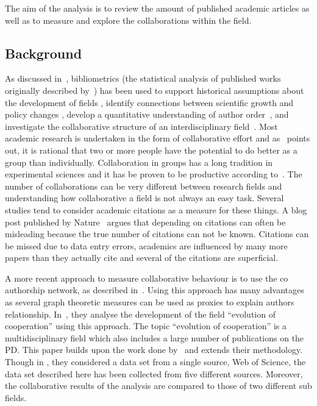 \documentclass{article}
\theoremstyle{definition}
\begin{document}
The aim of the analysis is to review the amount of published academic articles
as well as to measure and explore the collaborations within the field.


\subsection{Background}\label{section:background}

As discussed in~\cite{youngblood2018}, bibliometrics (the statistical analysis
of published works originally described by~\cite{pritchard1969}) has been used
to support historical assumptions about the development of fields
\cite{raina1998}, identify connections between scientific growth and policy
changes \cite{das2016}, develop a quantitative understanding of author
order~\cite{sekara2018}, and investigate the collaborative structure of an
interdisciplinary field~\cite{Liu2015}. Most academic research is undertaken in
the form of collaborative effort and as~\cite{Kyvik2017} points out, it is
rational that two or more people have the potential to do better as a group
than individually. Collaboration in groups has a long tradition in experimental
sciences and it has be proven to be productive according
to~\cite{Etzkowitz1992}. The number of collaborations can be very different
between research fields and understanding how collaborative a field is not
always an easy task. Several studies tend to consider academic citations as a
measure for these things. A blog post published by Nature~\cite{nature_blog}
argues that depending on citations can often be misleading because the true
number of citations can not be known. Citations can be missed due to data entry
errors, academics are influenced by many more papers than they actually cite and
several of the citations are superficial.

A more recent approach to measure collaborative behaviour is to use the co
authorship network, as described in~\cite{Liu2015}. Using this approach has many
advantages as several graph theoretic measures can be used as proxies to explain
authors relationship. In~\cite{Liu2015}, they analyse the development of the
field ``evolution of cooperation'' using this approach. The topic ``evolution of
cooperation'' is a multidisciplinary field which also includes a large number of
publications on the PD. This paper builds upon the work done
by~\cite{Liu2015} and extends their methodology. Though in \cite{Liu2015}, they
considered a data set from a single source, Web of Science, the data set
described here has been collected from five different sources. Moreover, the
collaborative results of the analysis are compared to those of two different sub
fields.
\end{document}
